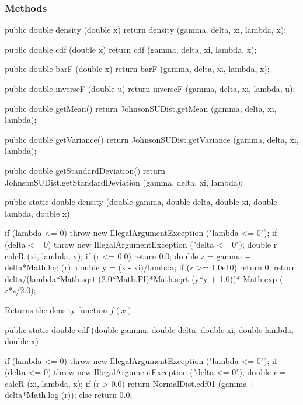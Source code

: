 \subsubsection* {Methods}
\begin{hide}
\begin{code}

   public double density (double x) {
      return density (gamma, delta, xi, lambda, x);
   }

   public double cdf (double x) {
      return cdf (gamma, delta, xi, lambda, x);
   }

   public double barF (double x) {
      return barF (gamma, delta, xi, lambda, x);
   }

   public double inverseF (double u){
      return inverseF (gamma, delta, xi, lambda, u);
   }

   public double getMean() {
      return JohnsonSUDist.getMean (gamma, delta, xi, lambda);
   }

   public double getVariance() {
      return JohnsonSUDist.getVariance (gamma, delta, xi, lambda);
   }

   public double getStandardDeviation() {
      return JohnsonSUDist.getStandardDeviation (gamma, delta, xi, lambda);
   }
\end{code}
\end{hide}\begin{code}

   public static double density (double gamma, double delta,
                                 double xi, double lambda, double x)\begin{hide} {
      if (lambda <= 0)
         throw new IllegalArgumentException ("lambda <= 0");
      if (delta <= 0)
         throw new IllegalArgumentException ("delta <= 0");
      double r = calcR (xi, lambda, x);
      if (r <= 0.0)
         return 0.0;
      double z = gamma + delta*Math.log (r);
      double y = (x - xi)/lambda;
      if (z >= 1.0e10)
         return 0;
      return delta/(lambda*Math.sqrt (2.0*Math.PI)*Math.sqrt (y*y + 1.0))*
           Math.exp (-z*z/2.0);
   }\end{hide}
\end{code}
\begin{tabb} Returns the density function $f(x)$.
\end{tabb}
\begin{code}

   public static double cdf (double gamma, double delta,
                             double xi, double lambda, double x)\begin{hide} {
      if (lambda <= 0)
         throw new IllegalArgumentException ("lambda <= 0");
      if (delta <= 0)
         throw new IllegalArgumentException ("delta <= 0");
      double r = calcR (xi, lambda, x);
      if (r > 0.0)
         return NormalDist.cdf01 (gamma + delta*Math.log (r));
      else
         return 0.0;
   }\end{hide}
\end{code}
